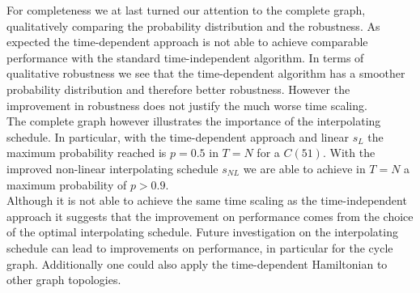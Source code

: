 For completeness we at last turned our attention to the complete graph, qualitatively comparing the probability distribution and the robustness. As expected the time-dependent approach is not able to achieve comparable performance with the standard time-independent algorithm.  In terms of qualitative robustness we see that the time-dependent algorithm has a smoother probability distribution and therefore better robustness. However the improvement in robustness does not justify the much worse time scaling. \\


The complete graph however illustrates the importance of the interpolating schedule. In particular, with the time-dependent approach and linear $s_L$ the maximum probability reached is $p=0.5$ in  $T=N$ for a $C(51)$. With the improved non-linear interpolating schedule $s_{NL}$ we are able to achieve in $T=N$ a maximum probability of $p>0.9$.\\


Although it is not able to achieve the same time scaling as the time-independent approach it suggests that the improvement on performance comes from the choice of the optimal interpolating schedule. Future investigation on the interpolating schedule can lead to improvements on performance, in particular for the cycle graph. Additionally one could also apply the time-dependent Hamiltonian to other graph topologies.
